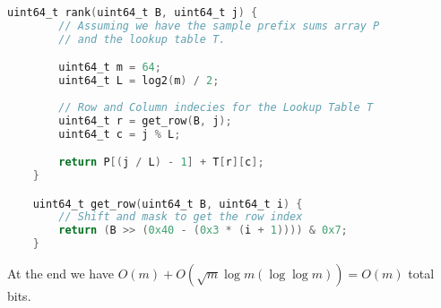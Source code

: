 \documentclass{article}
\begin{document}
\begin{lstlisting}[language=C,caption=`Rank function implemented using a bit array of 64 elements.']
    uint64_t rank(uint64_t B, uint64_t j) {
        // Assuming we have the sample prefix sums array P
        // and the lookup table T.

        uint64_t m = 64; 
        uint64_t L = log2(m) / 2;
        
        // Row and Column indecies for the Lookup Table T
        uint64_t r = get_row(B, j);
        uint64_t c = j % L;

        return P[(j / L) - 1] + T[r][c];
    }

    uint64_t get_row(uint64_t B, uint64_t i) {
        // Shift and mask to get the row index
        return (B >> (0x40 - (0x3 * (i + 1)))) & 0x7;
    }
\end{lstlisting}

\noindent At the end we have $O(m) + O(\sqrt{m}\log m (\log \log m)) = O(m)$ total bits.
\end{document}
